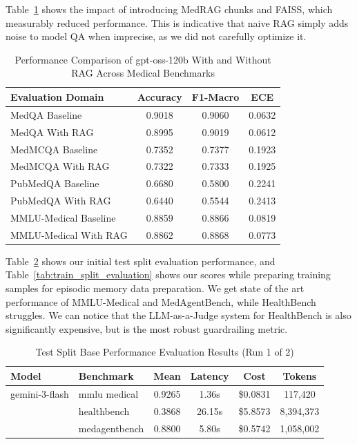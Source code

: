 \documentclass[conference]{IEEEtran}
\begin{document}
Table~\ref{tab:rag_evaluation} shows the impact of introducing MedRAG chunks and FAISS, which measurably reduced performance. This is indicative that naive RAG simply adds noise to model QA when imprecise, as we did not carefully optimize it.

\begin{table}[htbp]
\centering
\caption{Performance Comparison of gpt-oss-120b With and Without RAG Across Medical Benchmarks}
\label{tab:rag_evaluation}
\begin{tabular}{|p{2.2cm}|c|c|c|}
\hline
\textbf{Evaluation Domain} & \textbf{Accuracy} & \textbf{F1-Macro} & \textbf{ECE} \\
\hline
MedQA Baseline & 0.9018 & 0.9060 & 0.0632 \\
MedQA With RAG & 0.8995 & 0.9019 & 0.0612 \\
\hline
MedMCQA Baseline & 0.7352 & 0.7377 & 0.1923 \\
MedMCQA With RAG & 0.7322 & 0.7333 & 0.1925 \\
\hline
PubMedQA Baseline & 0.6680 & 0.5800 & 0.2241 \\
PubMedQA With RAG & 0.6440 & 0.5544 & 0.2413 \\
\hline
MMLU-Medical Baseline & 0.8859 & 0.8866 & 0.0819 \\
MMLU-Medical With RAG & 0.8862 & 0.8868 & 0.0773 \\
\hline
\end{tabular}
\end{table}

Table~\ref{tab:test_split_evaluation_base} shows our initial test split evaluation performance, and Table~\ref{tab:train_split_evaluation} shows our scores while preparing training samples for episodic memory data preparation. We get state of the art performance of MMLU-Medical and MedAgentBench, while HealthBench struggles. We can notice that the LLM-as-a-Judge system for HealthBench is also significantly expensive, but is the most robust guardrailing metric.

\begin{table}[htbp]
\centering
\caption{Test Split Base Performance Evaluation Results (Run 1 of 2)}
\label{tab:test_split_evaluation_base}
\begin{tabular}{p{1.4cm} p{1.6cm} c c c c}
\toprule
\textbf{Model} & \textbf{Benchmark} & \textbf{Mean} & \textbf{Latency} & \textbf{Cost} & \textbf{Tokens} \\
\midrule
gemini-3-flash & mmlu medical & 0.9265 & 1.36s & \$0.0831 & 117,420 \\
               & healthbench   & 0.3868 & 26.15s & \$5.8573 & 8,394,373 \\
               & medagentbench & 0.8800 & 5.80s & \$0.5742 & 1,058,002 \\
\bottomrule
\end{tabular}
\end{table}
\end{document}
